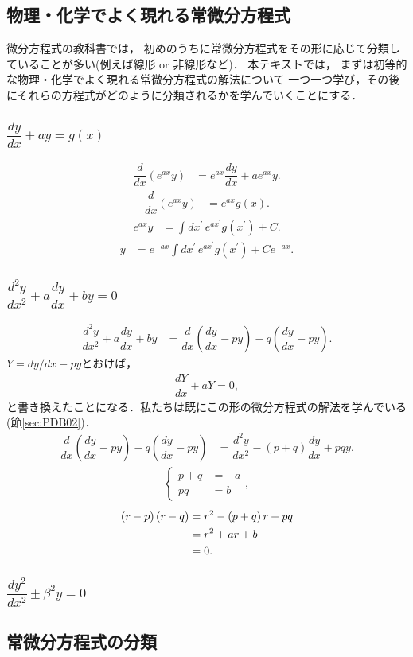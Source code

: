 \subsection{物理・化学でよく現れる常微分方程式}
%
微分方程式の教科書では，
初めのうちに常微分方程式をその形に応じて分類していることが多い(例えば線形 or 非線形など)．
本テキストでは，
まずは初等的な物理・化学でよく現れる常微分方程式の解法について
一つ一つ学び，その後にそれらの方程式がどのように分類されるかを学んでいくことにする．

\subsubsection{$\dfrac{dy}{dx} + a y = g(x)$\label{sec:PDB02}}
\begin{align}
  \dfrac{d}{dx}\left(e^{ax}y\right) & =e^{ax}\dfrac{dy}{dx}+ae^{ax}y.
\end{align}
\begin{align}
  \dfrac{d}{dx}\left(e^{ax}y\right) & =e^{ax}g\left(x\right).
\end{align}
\begin{align}
  e^{ax}y & =\int dx^{\prime}\,e^{ax^{\prime}}g\left(x^{\prime}\right)+C.
\end{align}
\begin{align}
 y & =e^{-ax}\int dx^{\prime}\,e^{ax^{\prime}}g\left(x^{\prime}\right)+Ce^{-ax}.
\end{align}
%
\subsubsection{$\dfrac{d^2y}{dx^2} + a \dfrac{dy}{dx} + by = 0$}
\begin{align}
  \dfrac{d^{2}y}{dx^{2}}+a\dfrac{dy}{dx}+by & =\dfrac{d}{dx}\left(\dfrac{dy}{dx}-py\right)-q\left(\dfrac{dy}{dx}-py\right).
\end{align}
$Y = dy/dx - py$とおけば，
\begin{align}
  \dfrac{dY}{dx} + aY = 0, 
\end{align}
と書き換えたことになる．私たちは既にこの形の微分方程式の解法を学んでいる(節\ref{sec:PDB02})．
\begin{align}
  \dfrac{d}{dx}\left(\dfrac{dy}{dx}-py\right)-q\left(\dfrac{dy}{dx}-py\right) & =\dfrac{d^{2}y}{dx^{2}}-\left(p+q\right)\dfrac{dy}{dx}+pqy.
\end{align}
\begin{align}
  \begin{cases}
    p + q &= -a \\
    pq    &= b 
  \end{cases},
\end{align}
\begin{align}
  \left(r-p\right)\left(r-q\right) \notag  
  & = r^2 - \left(p+q\right)r + pq \notag \\
  & = r^2 + ar + b \notag \\
  & = 0.
\end{align}
\subsubsection{$\dfrac{dy^2}{dx^2} \pm \beta^2 y =0$}
\subsection{常微分方程式の分類}
